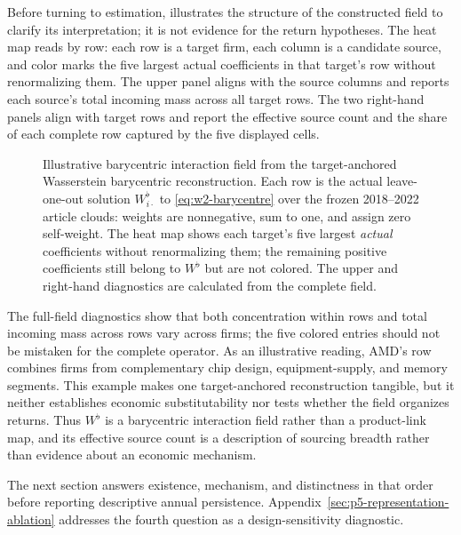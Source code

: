 Before turning to estimation,  illustrates
the structure of the constructed field to clarify its interpretation; it is not
evidence for the return hypotheses.
The heat map reads by row: each row is a target firm, each column is a candidate
source, and color marks the five largest actual coefficients in that target's
row without renormalizing them.
The upper panel aligns with the source columns and reports each source's total
incoming mass across all target rows.
The two right-hand panels align with target rows and report the effective source
count and the share of each complete row captured by the five displayed cells.

\begin{figure}[htbp]
  \centering
  \caption{Illustrative barycentric interaction field from the target-anchored
    Wasserstein barycentric reconstruction. Each row is the actual
    leave-one-out solution $W^\flat_{i\cdot}$ to \eqref{eq:w2-barycentre} over
    the frozen 2018--2022 article clouds: weights are nonnegative, sum to one,
    and assign zero self-weight. The heat map shows each target's five largest
    \emph{actual} coefficients without renormalizing them; the remaining
    positive coefficients still belong to $W^\flat$ but are not colored. The
  upper and right-hand diagnostics are calculated from the complete field.}
  \label{fig:wflat-barycentric-mixtures}
\end{figure}

The full-field diagnostics show that both concentration within rows and total
incoming mass across rows vary across firms; the five colored entries should
not be mistaken for the complete operator.
As an illustrative reading, AMD's row combines firms from complementary chip
design, equipment-supply, and memory segments.
This example makes one target-anchored reconstruction tangible, but it neither
establishes economic substitutability nor tests whether the field organizes
returns.
Thus $W^\flat$ is a barycentric interaction field rather than a product-link
map, and its effective source count is a description of sourcing breadth rather
than evidence about an economic mechanism.

The next section answers existence, mechanism, and distinctness in that order
before reporting descriptive annual persistence.
Appendix~\ref{sec:p5-representation-ablation} addresses the fourth question as
a design-sensitivity diagnostic.
